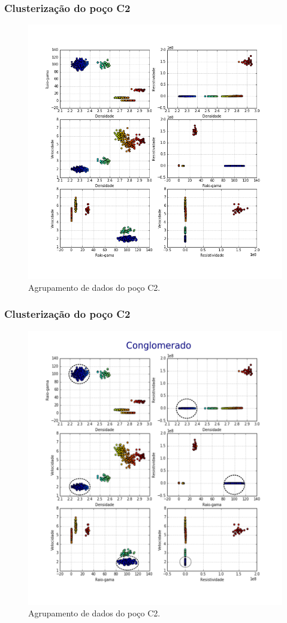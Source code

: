 \documentclass[10pt]{beamer} %
\begin{document}
\begin{frame}
	\frametitle{Clusterização do poço C2}
	\begin{figure}[H]
		\centering
			\includegraphics[scale=0.3]{Imagens/cluterpocoC2.png}
		\caption{Agrupamento de dados do poço C2.}
		\label{clusterC2}
	\end{figure} 
\end{frame}

\begin{frame}
	\frametitle{Clusterização do poço C2}
	\begin{figure}[H]
		\centering
		\includegraphics[scale=0.4]{Imagens/conglomeradoC2.png}
		\caption{Agrupamento de dados do poço C2.}
	\end{figure} 
\end{frame}
\end{document}
